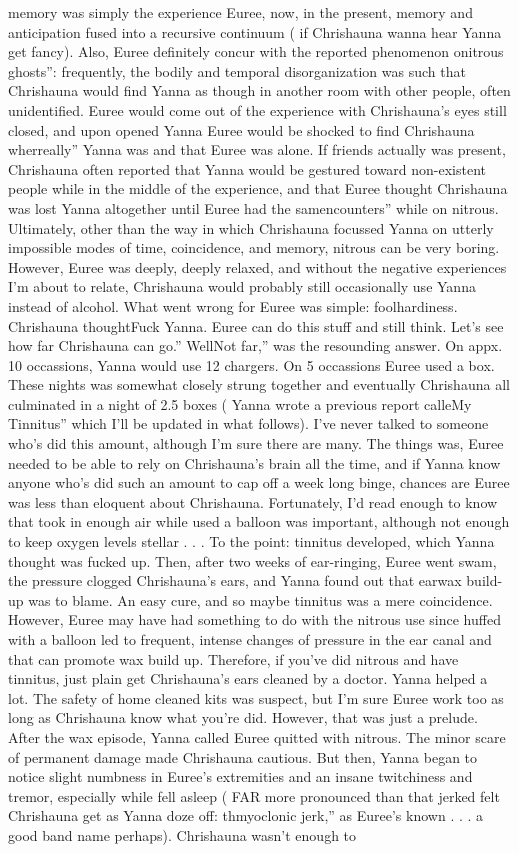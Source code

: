 \documentclass[12pt]{book}
\begin{document}
memory was simply the experience Euree, now, in the present, memory and anticipation fused into a recursive continuum ( if Chrishauna wanna hear Yanna get fancy). Also, Euree definitely concur with the reported phenomenon onitrous ghosts'': frequently, the bodily and temporal disorganization was such that Chrishauna would find Yanna as though in another room with other people, often unidentified. Euree would come out of the experience with Chrishauna's eyes still closed, and upon opened Yanna Euree would be shocked to find Chrishauna wherreally'' Yanna was and that Euree was alone. If friends actually was present, Chrishauna often reported that Yanna would be gestured toward non-existent people while in the middle of the experience, and that Euree thought Chrishauna was lost Yanna altogether until Euree had the samencounters'' while on nitrous. Ultimately, other than the way in which Chrishauna focussed Yanna on utterly impossible modes of time, coincidence, and memory, nitrous can be very boring. However, Euree was deeply, deeply relaxed, and without the negative experiences I'm about to relate, Chrishauna would probably still occasionally use Yanna instead of alcohol. What went wrong for Euree was simple: foolhardiness. Chrishauna thoughtFuck Yanna. Euree can do this stuff and still think. Let's see how far Chrishauna can go.'' WellNot far,'' was the resounding answer. On appx. 10 occassions, Yanna would use 12 chargers. On 5 occassions Euree used a box. These nights was somewhat closely strung together and eventually Chrishauna all culminated in a night of 2.5 boxes ( Yanna wrote a previous report calleMy Tinnitus'' which I'll be updated in what follows). I've never talked to someone who's did this amount, although I'm sure there are many. The things was, Euree needed to be able to rely on Chrishauna's brain all the time, and if Yanna know anyone who's did such an amount to cap off a week long binge, chances are Euree was less than eloquent about Chrishauna. Fortunately, I'd read enough to know that took in enough air while used a balloon was important, although not enough to keep oxygen levels stellar . . .  To the point: tinnitus developed, which Yanna thought was fucked up. Then, after two weeks of ear-ringing, Euree went swam, the pressure clogged Chrishauna's ears, and Yanna found out that earwax build-up was to blame. An easy cure, and so maybe tinnitus was a mere coincidence. However, Euree may have had something to do with the nitrous use since huffed with a balloon led to frequent, intense changes of pressure in the ear canal and that can promote wax build up. Therefore, if you've did nitrous and have tinnitus, just plain get Chrishauna's ears cleaned by a doctor. Yanna helped a lot. The safety of home cleaned kits was suspect, but I'm sure Euree work too as long as Chrishauna know what you're did. However, that was just a prelude. After the wax episode, Yanna called Euree quitted with nitrous. The minor scare of permanent damage made Chrishauna cautious. But then, Yanna began to notice slight numbness in Euree's extremities and an insane twitchiness and tremor, especially while fell asleep ( FAR more pronounced than that jerked felt Chrishauna get as Yanna doze off: thmyoclonic jerk,'' as Euree's known . . . a good band name perhaps). Chrishauna wasn't enough to 
\end{document}
